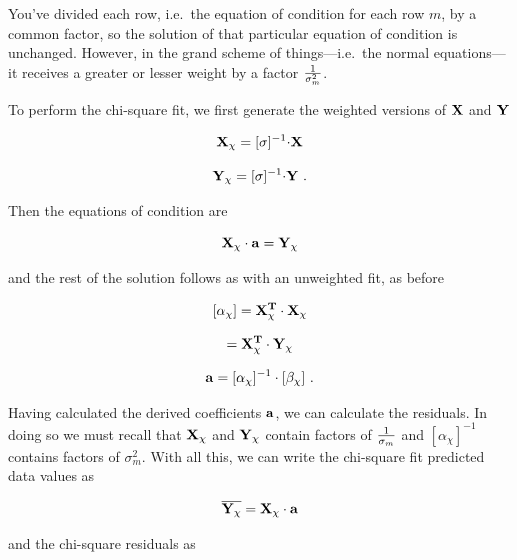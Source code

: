\documentclass[psfig,preprint]{aastex}
\begin{document}
\noindent You've divided each row, i.e.\ the equation of condition for
each row $m$, by a common factor, so the solution of that particular
equation of condition is unchanged. However, in the grand scheme of
things---i.e.\ the normal equations---it receives a greater or lesser
weight by a factor ${1 \over \sigma_m^2}$.

	
	To perform the chi-square fit, we first generate the weighted
versions of $\bf X$ and $\bf Y$

\begin{mathletters} \label{matrixcalcs}
\begin{equation}
{\bf X_\chi} =  [\sigma]^{-1} {\bf \cdot X} 
\end{equation}

\begin{equation}
{\bf Y_\chi} =   [\sigma]^{-1} {\bf \cdot Y} \ .
\end{equation}

\noindent Then the equations of condition are

\begin{equation}
{\bf X_\chi \cdot a} = {\bf Y_\chi}
\end{equation}

\noindent and the rest of the solution follows as with an unweighted
fit, as before

\begin{equation} \label{curvmatrixalpha}
[\alpha_\chi]  =  {\bf X_\chi^T \cdot X_\chi}
\end{equation}

\begin{equation}
[\beta_\chi] = {\bf X_\chi^T \cdot Y_\chi}
\end{equation}

\begin{equation} \label{a_equation}
{\bf a} = [\alpha_\chi]^{-1} \cdot [\beta_\chi] \ .
\end{equation}

\noindent Having calculated the derived coefficients $\bf a$, we can
calculate the residuals.  In doing so we must recall that $\bf X_\chi$
and $\bf Y_\chi$ contain factors of $1 \over \sigma_m$ and
$[\alpha_\chi]^{-1}$ contains factors of $\sigma_m^2$.  With all this, we can
write the chi-square fit predicted data values as

\begin{equation}
\overline {\bf Y_\chi} = {\bf X_\chi \cdot a}
\end{equation}

\noindent and the chi-square residuals as


\end{mathletters}
\end{document}
